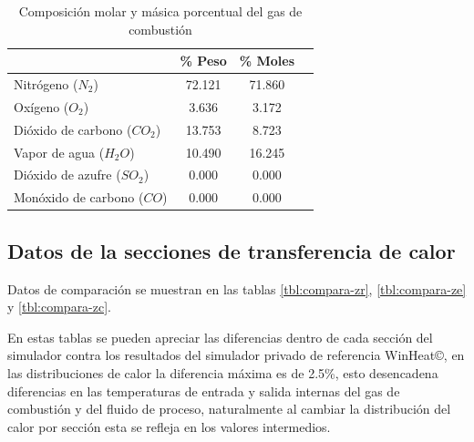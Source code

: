 \begin{table}
\begin{center}
\caption[Composición del gas de combustión]{Composición molar y másica porcentual del gas de combustión}
\label{tbl:combustion-gas}
\begin{tabular}{l|c|c|c}
		& \% Peso & \% Moles \\
	\hline
	Nitrógeno ($N_2$)			& 72.121	& 71.860 \\
	Oxígeno ($O_2$)				& 3.636 	& 3.172	 \\
	Dióxido de carbono ($CO_2$)	& 13.753	& 8.723	 \\
	Vapor de agua ($H_2O$)		& 10.490	& 16.245 \\
	Dióxido de azufre ($SO_2$)	& 0.000 	& 0.000	 \\
	Monóxido de carbono ($CO$)	& 0.000 	& 0.000	 \\
\end{tabular}
\end{center}
\end{table}

\subsection{Datos de la secciones de transferencia de calor}

\par Datos de comparación se muestran en las tablas \ref{tbl:compara-zr}, \ref{tbl:compara-ze} y \ref{tbl:compara-zc}.

\par En estas tablas se pueden apreciar las diferencias dentro de cada sección del simulador contra los resultados del simulador privado de referencia WinHeat\copyright, en las distribuciones de calor la diferencia máxima es de 2.5\%, esto desencadena diferencias en las temperaturas de entrada y salida internas del gas de combustión y del fluido de proceso, naturalmente al cambiar la distribución del calor por sección esta se refleja en los valores intermedios.

